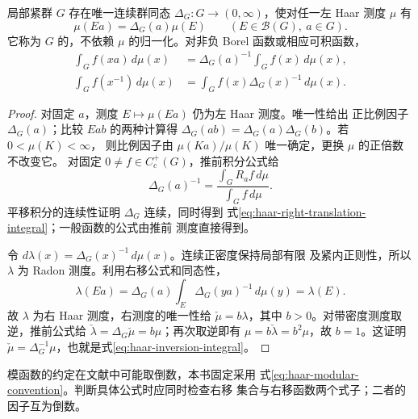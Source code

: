 \begin{theorem}[模函数与取逆公式]
\label{thm:haar-modular-function}
局部紧群 $G$ 存在唯一连续群同态
$\Delta_G:G\to(0,\infty)$，使对任一左 Haar 测度 $\mu$ 有
\begin{equation}
 \mu(Ea)=\Delta_G(a)\mu(E)
 \qquad(E\in\mathcal B(G),\ a\in G).
 \label{eq:haar-modular-convention}
\end{equation}
它称为 $G$ 的，不依赖 $\mu$ 的归一化。对非负 Borel
函数或相应可积函数，
\begin{align}
 \int_G f(xa)\,d\mu(x)
 &=\Delta_G(a)^{-1}\int_G f(x)\,d\mu(x),
 \label{eq:haar-right-translation-integral}\\
 \int_G f(x^{-1})\,d\mu(x)
 &=\int_G f(x)\Delta_G(x)^{-1}\,d\mu(x).
 \label{eq:haar-inversion-integral}
\end{align}
\end{theorem}

\begin{proof}
对固定 $a$，测度 $E\mapsto\mu(Ea)$ 仍为左 Haar 测度。唯一性给出
正比例因子 $\Delta_G(a)$；比较 $Eab$ 的两种计算得
$\Delta_G(ab)=\Delta_G(a)\Delta_G(b)$。若 $0<\mu(K)<\infty$，
则比例因子由 $\mu(Ka)/\mu(K)$ 唯一确定，更换 $\mu$ 的正倍数不改变它。
对固定 $0\ne f\in C_c^+(G)$，推前积分公式给
\[
 \Delta_G(a)^{-1}=\frac{\int_G R_af\,d\mu}{\int_G f\,d\mu}.
\]
平移积分的连续性证明 $\Delta_G$ 连续，同时得到
式\eqref{eq:haar-right-translation-integral}；一般函数的公式由推前
测度直接得到。

令 $d\lambda(x)=\Delta_G(x)^{-1}\,d\mu(x)$。连续正密度保持局部有限
及紧内正则性，所以 $\lambda$ 为 Radon 测度。利用右移公式和同态性，
\[
 \lambda(Ea)=\Delta_G(a)\int_E\Delta_G(ya)^{-1}\,d\mu(y)
 =\lambda(E).
\]
故 $\lambda$ 为右 Haar 测度，右测度的唯一性给
$\check\mu=b\lambda$，其中 $b>0$。对带密度测度取逆，推前公式给
$\check\lambda=\Delta_G\check\mu=b\mu$；再次取逆即有
$\mu=b\check\lambda=b^2\mu$，故 $b=1$。这证明
$\check\mu=\Delta_G^{-1}\mu$，也就是式\eqref{eq:haar-inversion-integral}。
\end{proof}

模函数的约定在文献中可能取倒数，本书固定采用
式\eqref{eq:haar-modular-convention}。判断具体公式时应同时检查右移
集合与右移函数两个式子；二者的因子互为倒数。

